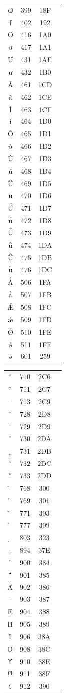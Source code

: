 ﻿\documentclass[10pt]{article}
\begin{document}
\begin{tabular}{crcl}
Ə&399&18F&\\
ƒ&402&192&\\
Ơ&416&1A0&\\
ơ&417&1A1&\\
Ư&431&1AF&\\
ư&432&1B0&\\
Ǎ&461&1CD&\\
ǎ&462&1CE&\\
Ǐ&463&1CF&\\
ǐ&464&1D0&\\
Ǒ&465&1D1&\\
ǒ&466&1D2&\\
Ǔ&467&1D3&\\
ǔ&468&1D4&\\
Ǖ&469&1D5&\\
ǖ&470&1D6&\\
Ǘ&471&1D7&\\
ǘ&472&1D8&\\
Ǚ&473&1D9&\\
ǚ&474&1DA&\\
Ǜ&475&1DB&\\
ǜ&476&1DC&\\
Ǻ&506&1FA&\\
ǻ&507&1FB&\\
Ǽ&508&1FC&\\
ǽ&509&1FD&\\
Ǿ&510&1FE&\\
ǿ&511&1FF&\\
ə&601&259&\\
\end{tabular}

\begin{tabular}{crcl}
ˆ&710&2C6&\\
ˇ&711&2C7&\\
ˉ&713&2C9&\\
˘&728&2D8&\\
˙&729&2D9&\\
˚&730&2DA&\\
˛&731&2DB&\\
˜&732&2DC&\\
˝&733&2DD&\\
̀&768&300&\\
́&769&301&\\
̃&771&303&\\
̉&777&309&\\
̣&803&323&\\
;&894&37E&\\
΄&900&384&\\
΅&901&385&\\
Ά&902&386&\\
·&903&387&\\
Έ&904&388&\\
Ή&905&389&\\
Ί&906&38A&\\
Ό&908&38C&\\
Ύ&910&38E&\\
Ώ&911&38F&\\
ΐ&912&390&\\
\end{tabular}
\end{document}

